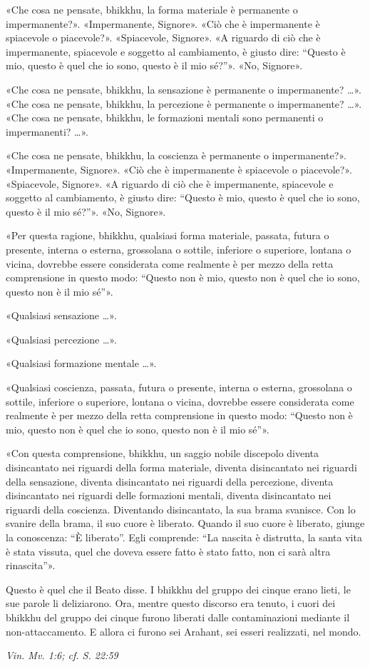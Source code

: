 «Che cosa ne pensate, bhikkhu, la forma materiale è permanente o
impermanente?». «Impermanente, Signore». «Ciò che è impermanente è
spiacevole o piacevole?». «Spiacevole, Signore». «A riguardo di ciò che
è impermanente, spiacevole e soggetto al cambiamento, è giusto dire:
“Questo è mio, questo è quel che io sono, questo è il mio sé?”». «No,
Signore».


«Che cosa ne pensate, bhikkhu, la sensazione è permanente o
impermanente? …​». «Che cosa ne pensate, bhikkhu, la percezione è
permanente o impermanente? …​». «Che cosa ne pensate, bhikkhu, le
formazioni mentali sono permanenti o impermanenti? …​».


«Che cosa ne pensate, bhikkhu, la coscienza è permanente o
impermanente?». «Impermanente, Signore». «Ciò che è impermanente è
spiacevole o piacevole?». «Spiacevole, Signore». «A riguardo di ciò che
è impermanente, spiacevole e soggetto al cambiamento, è giusto dire:
“Questo è mio, questo è quel che io sono, questo è il mio sé?”». «No,
Signore».


«Per questa ragione, bhikkhu, qualsiasi forma materiale, passata, futura
o presente, interna o esterna, grossolana o sottile, inferiore o
superiore, lontana o vicina, dovrebbe essere considerata come realmente
è per mezzo della retta comprensione in questo modo: “Questo non è mio,
questo non è quel che io sono, questo non è il mio sé”».


«Qualsiasi sensazione …​».


«Qualsiasi percezione …​».


«Qualsiasi formazione mentale …​».


«Qualsiasi coscienza, passata, futura o presente, interna o esterna,
grossolana o sottile, inferiore o superiore, lontana o vicina, dovrebbe
essere considerata come realmente è per mezzo della retta comprensione
in questo modo: “Questo non è mio, questo non è quel che io sono, questo
non è il mio sé”».


«Con questa comprensione, bhikkhu, un saggio nobile discepolo diventa
disincantato nei riguardi della forma materiale, diventa disincantato
nei riguardi della sensazione, diventa disincantato nei riguardi della
percezione, diventa disincantato nei riguardi delle formazioni mentali,
diventa disincantato nei riguardi della coscienza. Diventando
disincantato, la sua brama svanisce. Con lo svanire della brama, il suo
cuore è liberato. Quando il suo cuore è liberato, giunge la conoscenza:
“È liberato”. Egli comprende: “La nascita è distrutta, la santa vita è
stata vissuta, quel che doveva essere fatto è stato fatto, non ci sarà
altra rinascita”».


Questo è quel che il Beato disse. I bhikkhu del gruppo dei cinque erano
lieti, le sue parole li deliziarono. Ora, mentre questo discorso era
tenuto, i cuori dei bhikkhu del gruppo dei cinque furono liberati dalle
contaminazioni mediante il non-attaccamento. E allora ci furono sei
Arahant, sei esseri realizzati, nel mondo.


\emph{Vin. Mv. 1:6; cf. S. 22:59}


